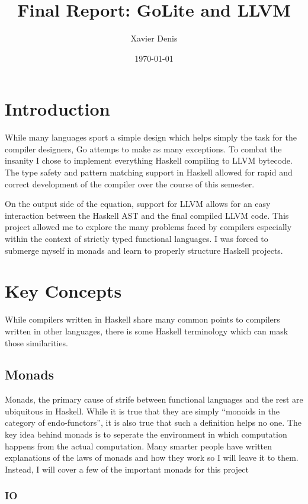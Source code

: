 \documentclass[11pt]{article}
\begin{document}
\title{Final Report: GoLite and LLVM}
\author{Xavier Denis}
\date{\today}
\maketitle

\section{Introduction}

While many languages sport a simple design which helps simply the task for the compiler designers, Go attemps to make as many exceptions. To combat the insanity I chose to implement everything Haskell compiling to LLVM bytecode. The type safety and pattern matching support in Haskell allowed for rapid and correct development of the compiler over the course of this semester. 

On the output side of the equation, support for LLVM allows for an easy interaction between the Haskell AST and the final compiled LLVM code. This project allowed me to explore the many problems faced by compilers especially within the context of strictly typed functional languages. I was forced to submerge myself in monads and learn to properly structure Haskell projects. 

\section{Key Concepts}

While compilers written in Haskell share many common points to compilers written in other languages, there is some Haskell terminology which can mask those similarities. 

\subsection{Monads}

Monads, the primary cause of strife between functional languages and the rest are ubiquitous in Haskell. While it is true that they are simply ``monoids in the category of endo-functors'', it is also true that such a definition helps no one. The key idea behind monads is to seperate the environment in which computation happens from the actual computation. Many smarter people have written explanations of the laws of monads and how they work so I will leave it to them. Instead, I will cover a few of the important monads for this project

\subsubsection{IO}
\end{document}
